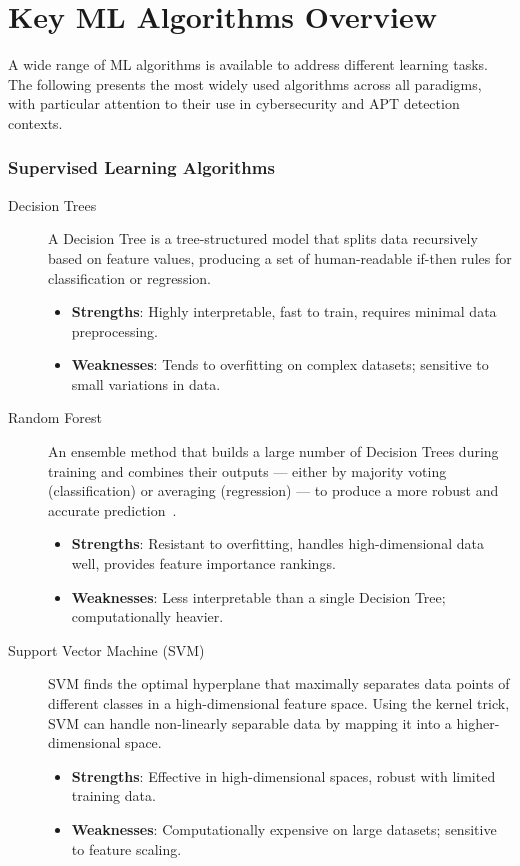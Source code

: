 \section{Key ML Algorithms Overview}

A wide range of ML algorithms is available to address different learning tasks. The following presents the most widely used algorithms across all paradigms, with particular attention to their use in cybersecurity and APT detection contexts.

\subsubsection*{Supervised Learning Algorithms}

\begin{description}
    \item[Decision Trees] A Decision Tree is a tree-structured model that splits data recursively based on feature values, producing a set of human-readable if-then rules for classification or regression.
    \begin{itemize}
        \item \textbf{Strengths}: Highly interpretable, fast to train, requires minimal data preprocessing.
        \item \textbf{Weaknesses}: Tends  to overfitting on complex datasets; sensitive to small variations in data.
    \end{itemize}

    \item[Random Forest] An ensemble method that builds a large number of Decision Trees during training and combines their outputs --- either by majority voting (classification) or averaging (regression) --- to produce a more robust and accurate prediction~\cite{breiman2001random}.
    \begin{itemize}
        \item \textbf{Strengths}: Resistant to overfitting, handles high-dimensional data well, provides feature importance rankings.
        \item \textbf{Weaknesses}: Less interpretable than a single Decision Tree; computationally heavier.
    \end{itemize}

    \item[Support Vector Machine (SVM)] SVM finds the optimal hyperplane that maximally separates data points of different classes in a high-dimensional feature space. Using the kernel trick, SVM can handle non-linearly separable data by mapping it into a higher-dimensional space.
    \begin{itemize}
        \item \textbf{Strengths}: Effective in high-dimensional spaces, robust with limited training data.
        \item \textbf{Weaknesses}: Computationally expensive on large datasets; sensitive to feature scaling.
    \end{itemize}


\end{description}

